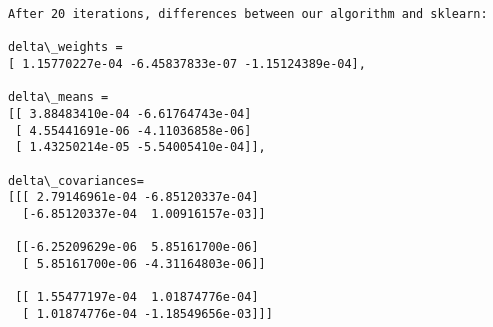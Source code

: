 \documentclass[11pt]{article}
\begin{document}
    \begin{Verbatim}[commandchars=\\\{\}]
After 20 iterations, differences between our algorithm and sklearn:

delta\_weights =
[ 1.15770227e-04 -6.45837833e-07 -1.15124389e-04],

delta\_means =
[[ 3.88483410e-04 -6.61764743e-04]
 [ 4.55441691e-06 -4.11036858e-06]
 [ 1.43250214e-05 -5.54005410e-04]],

delta\_covariances=
[[[ 2.79146961e-04 -6.85120337e-04]
  [-6.85120337e-04  1.00916157e-03]]

 [[-6.25209629e-06  5.85161700e-06]
  [ 5.85161700e-06 -4.31164803e-06]]

 [[ 1.55477197e-04  1.01874776e-04]
  [ 1.01874776e-04 -1.18549656e-03]]]
    \end{Verbatim}


    
    
    
\end{document}
